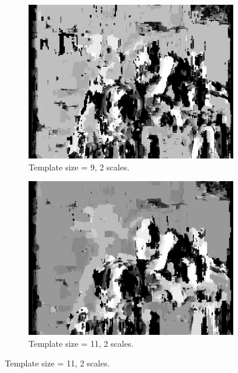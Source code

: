\documentclass[12pt,a4paper,oneside,final]{article}
\begin{document}
\begin{table}[H]
\begin{subtable}{1\textwidth}
\begin{figure}[H]
\begin{subfigure}[b]{0.24\textwidth}
			\includegraphics[width=\textwidth]{disparity_s2_k9set_1.png}
			\caption{Template size = 9, 2 scales.}
		\end{subfigure}
		\begin{subfigure}[b]{0.24\textwidth}
			\includegraphics[width=\textwidth]{disparity_s2_k11set_1.png}
			\caption{Template size = 11, 2 scales.}
		\end{subfigure}
	\end{figure}
	\begin{figure}[H]
		\ContinuedFloat
		\begin{subfigure}[b]{0.24\textwidth}

\end{subfigure}
\end{figure}
\end{subtable}
\end{table}
\end{document}
